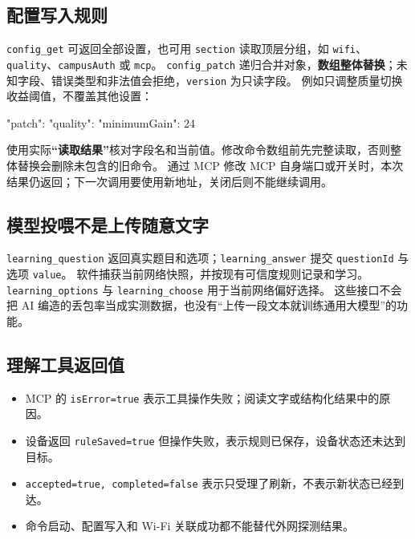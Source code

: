\documentclass[UTF8,fontset=fandol,11pt,a4paper]{ctexart}
\newcommand{\ui}[1]{\textbf{“#1”}}
\newcommand{\tool}[1]{\nolinkurl{#1}}
\begin{document}
\subsection{配置写入规则}
\tool{config_get} 可返回全部设置，也可用 \tool{section} 读取顶层分组，如 \tool{wifi}、\tool{quality}、\tool{campusAuth} 或 \tool{mcp}。
\tool{config_patch} 递归合并对象，\textbf{数组整体替换}；未知字段、错误类型和非法值会拒绝，\tool{version} 为只读字段。
例如只调整质量切换收益阈值，不覆盖其他设置：
\begin{Code}
{
  "patch": {
    "quality": { "minimumGain": 24 }
  }
}
\end{Code}
使用实际\ui{读取结果}核对字段名和当前值。修改命令数组前先完整读取，否则整体替换会删除未包含的旧命令。
通过 MCP 修改 MCP 自身端口或开关时，本次结果仍返回；下一次调用要使用新地址，关闭后则不能继续调用。

\subsection{模型投喂不是上传随意文字}
\tool{learning_question} 返回真实题目和选项；\tool{learning_answer} 提交 \tool{questionId} 与选项 \tool{value}。
软件捕获当前网络快照，并按现有可信度规则记录和学习。
\tool{learning_options} 与 \tool{learning_choose} 用于当前网络偏好选择。
这些接口不会把 AI 编造的丢包率当成实测数据，也没有“上传一段文本就训练通用大模型”的功能。

\subsection{理解工具返回值}
\begin{itemize}
\item MCP 的 \tool{isError=true} 表示工具操作失败；阅读文字或结构化结果中的原因。
\item 设备返回 \tool{ruleSaved=true} 但操作失败，表示规则已保存，设备状态还未达到目标。
\item \tool{accepted=true, completed=false} 表示只受理了刷新，不表示新状态已经到达。
\item 命令启动、配置写入和 Wi-Fi 关联成功都不能替代外网探测结果。
\end{itemize}
\end{document}
